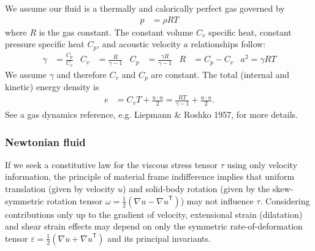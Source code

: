 \documentclass[letterpaper,11pt,nointlimits]{amsart}
\newcommand{\trans}[1]{{#1}^{\ensuremath{\mathsf{T}}}}
\begin{document}
We assume our fluid is a thermally and calorically perfect gas governed by
\begin{align}
  \label{eq:perfectgaseos}
  p &= \rho{} R T
\end{align}
where $R$ is the gas constant. The constant volume $C_{v}$ specific heat,
constant pressure specific heat $C_{p}$, and acoustic velocity $a$ 
relationships follow:
\begin{align}
  \label{eq:perfectgasrelations}
  \gamma &= \frac{C_{p}}{C_{v}}
  &
  C_{v} &= \frac{R}{\gamma - 1}
  &
  C_{p} &= \frac{\gamma{}R}{\gamma-1}
  &
  R &= C_{p} - C_{v}
  &
  a^{2} = \gamma{}RT
\end{align}
We assume $\gamma$ and therefore $C_{v}$ and $C_{p}$ are constant.
The total (internal and kinetic) energy density is
\begin{align}
  \label{eq:perfectgastotalenergy}
  e &= C_{v} T + \frac{u\cdot{}u}{2}
     = \frac{RT}{\gamma-1} + \frac{u\cdot{}u}{2}
  .
\end{align}
See a gas dynamics reference, e.g. Liepmann \& Roshko 1957, for more details.

\subsubsection{Newtonian fluid}

If we seek a constitutive law for the viscous stress tensor $\tau$
using only velocity information, the principle of material frame
indifference implies that uniform translation (given by velocity $u$)
and solid-body rotation (given by the skew-symmetric rotation tensor
$\omega=\frac{1}{2}\left( \nabla{}u-\trans{\nabla{}u} \right)$)
may not influence $\tau$.  Considering contributions only up to the
gradient of velocity, extensional strain (dilatation) and shear strain
effects may depend on only the symmetric rate-of-deformation tensor
$\varepsilon=\frac{1}{2}\left( \nabla{}u+\trans{\nabla{}u}\right)$
and its principal invariants.
\end{document}
